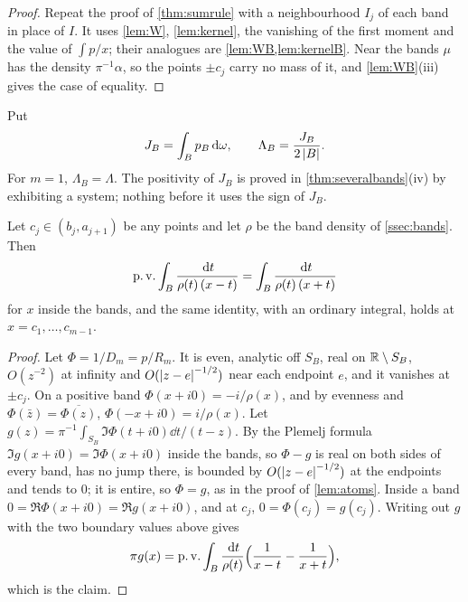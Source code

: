 \begin{proof}
Repeat the proof of \cref{thm:sumrule} with a neighbourhood $I_j$ of each band
in place of $I$. It uses \cref{lem:W}, \cref{lem:kernel}, the vanishing of the
first moment and the value of $\int p/x$; their analogues are
\cref{lem:WB,lem:kernelB}. Near the bands $\mu$ has the density
$\pi^{-1}\alpha$, so the points $\pm c_j$ carry no mass of it, and
\cref{lem:WB}(iii) gives the case of equality.
\end{proof}

Put
\[
J_B=\int_Bp_B\,\mathrm d\omega,\qquad \Lambda_B=\frac{J_B}{2\left|B\right|}.
\]
For $m=1$, $\Lambda_B=\Lambda$. The positivity of $J_B$ is proved in
\cref{thm:severalbands}(iv) by exhibiting a system; nothing before it uses
the sign of $J_B$.

\begin{lemma}\label{lem:glauertB}
Let $c_j\in(b_j,a_{j+1})$ be any points and let $\rho$ be the band density of
\cref{ssec:bands}. Then
\[
\operatorname{p.v.}\int_B\frac{\,\mathrm d t}{\rho(t)\,(x-t)}=\int_B\frac{\,\mathrm d t}{\rho(t)\,(x+t)}
\]
for $x$ inside the bands, and the same identity, with an ordinary integral,
holds at $x=c_1,\dots,c_{m-1}$.
\end{lemma}

\begin{proof}
Let $\Phi=1/D_m=p/R_m$. It is even, analytic off $S_B$, real on $\mathbb R\setminus
S_B$, $O(z^{-2})$ at infinity and $O(\left|z-e\right|^{-1/2})$ near each endpoint
$e$, and it vanishes at $\pm c_j$. On a positive band $\Phi(x+i0)=-i/\rho(x)$,
and by evenness and $\Phi(\bar z)=\overline{\Phi(z)}$,
$\Phi(-x+i0)=i/\rho(x)$. Let $g(z)=\pi^{-1}\int_{S_B}\Im\Phi(t+i0)\dd t/(t-z)$.
By the Plemelj formula $\Im g(x+i0)=\Im\Phi(x+i0)$ inside the bands, so
$\Phi-g$ is real on both sides of every band, has no jump there, is bounded
by $O(\left|z-e\right|^{-1/2})$ at the endpoints and tends to $0$; it is entire, so
$\Phi=g$, as in the proof of \cref{lem:atoms}. Inside a band
$0=\Re\Phi(x+i0)=\Re g(x+i0)$, and at $c_j$, $0=\Phi(c_j)=g(c_j)$. Writing
out $g$ with the two boundary values above gives
\[
\pi g(x)=\operatorname{p.v.}\int_B\frac{\,\mathrm d t}{\rho(t)}\Big(\frac1{x-t}-\frac1{x+t}\Big),
\]
which is the claim.
\end{proof}

